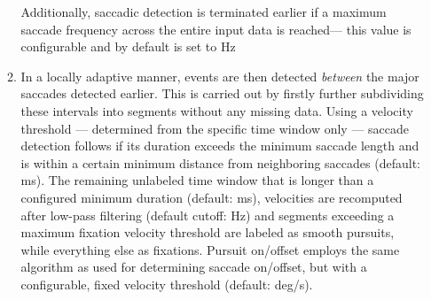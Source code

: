 \begin{enumerate}
\begin{enumerate}
 Additionally, saccadic detection is terminated earlier if a maximum saccade frequency across the entire input data is reached--- this value is configurable and by default is set to \unit[2]{Hz}
 
 \item In a locally adaptive manner, events are then detected \textit{between} the major saccades detected earlier. This is carried out by firstly further subdividing these intervals into segments without any missing data. Using a velocity threshold --- determined from the specific time window only --- saccade detection follows if its duration exceeds the minimum saccade length and is within a certain minimum distance from neighboring saccades (default: \unit[130]{ms}). 
 The remaining unlabeled time window that is longer than a configured minimum duration (default: \unit[40]{ms}), velocities are recomputed after low-pass filtering (default cutoff: \unit[4]{Hz}) and segments exceeding a maximum fixation velocity threshold are labeled as smooth pursuits, while everything else as fixations. Pursuit on/offset employs the same algorithm as \citet{Nystrom2010AnData} used for determining saccade on/offset, but with a configurable, fixed velocity threshold (default: \unit[2]{deg/s}). 
   
\end{enumerate}
\end{enumerate}

